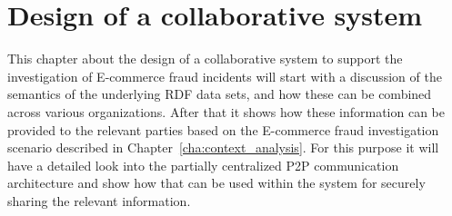 
\chapter{Design of a collaborative system} %
\label{cha:system_design}

This chapter about the design of a collaborative system to support the investigation of \gls{E-commerce} fraud incidents will start with a discussion of the semantics of the underlying \gls{RDF} data sets, and how these can be combined across various organizations. After that it shows how these information can be provided to the relevant parties based on the \gls{E-commerce} fraud investigation scenario described in Chapter~\ref{cha:context_analysis}. For this purpose it will have a detailed look into the partially centralized \gls{P2P} communication architecture and show how that can be used within the system for securely sharing the relevant information.







